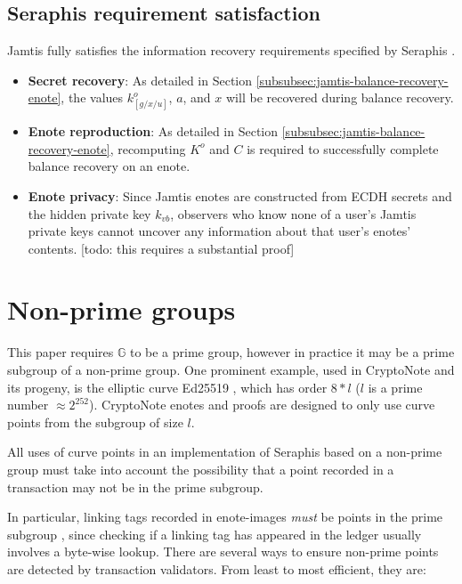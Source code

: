 \subsection{Seraphis requirement satisfaction}
\label{subsec:jamtis-seraphis-requirements}

Jamtis fully satisfies the information recovery requirements specified by Seraphis \cite{seraphis}.

\begin{itemize}
    \item \textbf{Secret recovery}: As detailed in Section \ref{subsubsec:jamtis-balance-recovery-enote}, the values $k^o_{[g/x/u]}$, $a$, and $x$ will be recovered during balance recovery.

    \item \textbf{Enote reproduction}: As detailed in Section \ref{subsubsec:jamtis-balance-recovery-enote}, recomputing $K^o$ and $C$ is required to successfully complete balance recovery on an enote.

    \item \textbf{Enote privacy}: Since Jamtis enotes are constructed from ECDH secrets and the hidden private key $k_{vb}$, observers who know none of a user's Jamtis private keys cannot uncover any information about that user's enotes' contents. [todo: this requires a substantial proof]
\end{itemize}



\section{Non-prime groups}
\label{sec:non-prime-groups}

This paper requires $\mathbb{G}$ to be a prime group, however in practice it may be a prime subgroup of a non-prime group. One prominent example, used in CryptoNote \cite{cryptoNoteWhitePaper} and its progeny, is the elliptic curve Ed25519 \cite{Bernstein2012-high-speed-high-security-ed25519}, which has order $8*l$ ($l$ is a prime number $\approx 2^{252}$). CryptoNote enotes and proofs are designed to only use curve points from the subgroup of size $l$.

All uses of curve points in an implementation of Seraphis based on a non-prime group must take into account the possibility that a point recorded in a transaction may not be in the prime subgroup.

In particular, linking tags recorded in enote-images {\em must} be points in the prime subgroup \cite{key-image-bug}, since checking if a linking tag has appeared in the ledger usually involves a byte-wise lookup. There are several ways to ensure non-prime points are detected by transaction validators. From least to most efficient, they are:

